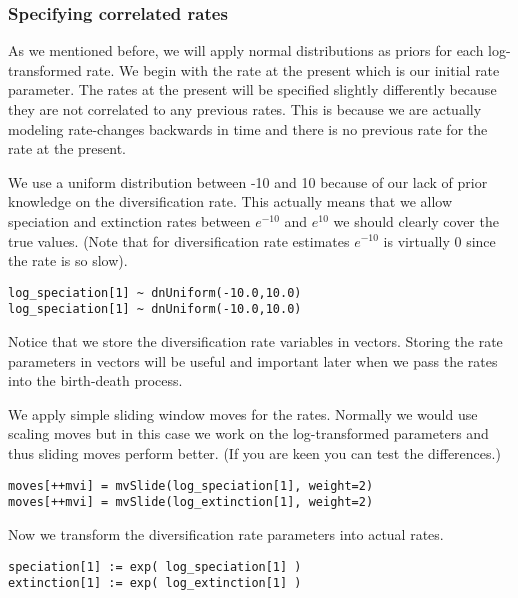 \subsubsection{Specifying correlated rates}
As we mentioned before, we will apply normal distributions as priors for each log-transformed rate.
We begin with the rate at the present which is our initial rate parameter.
The rates at the present will be specified slightly differently because they are not correlated to any previous rates.
This is because we are actually modeling rate-changes backwards in time and there is no previous rate for the rate at the present.

We use a uniform distribution between -10 and 10 because of our lack of prior knowledge on the diversification rate.
This actually means that we allow speciation and extinction rates between $e^{-10}$ and $e^10$ we should clearly cover the true values.
(Note that for diversification rate estimates $e^{-10}$ is virtually 0 since the rate is so slow).
{\tt \begin{snugshade*}
\begin{lstlisting}
log_speciation[1] ~ dnUniform(-10.0,10.0)
log_speciation[1] ~ dnUniform(-10.0,10.0)
\end{lstlisting}
\end{snugshade*}}
Notice that we store the diversification rate variables in vectors.
Storing the rate parameters in vectors will be useful and important later when we pass the rates into the birth-death process.

We apply simple sliding window moves for the rates.
Normally we would use scaling moves but in this case we work on the log-transformed parameters and thus sliding moves perform better.
(If you are keen you can test the differences.)
{\tt \begin{snugshade*}
\begin{lstlisting}
moves[++mvi] = mvSlide(log_speciation[1], weight=2)
moves[++mvi] = mvSlide(log_extinction[1], weight=2)
\end{lstlisting}
\end{snugshade*}}
Now we transform the diversification rate parameters into actual rates.
{\tt \begin{snugshade*}
\begin{lstlisting}
speciation[1] := exp( log_speciation[1] )
extinction[1] := exp( log_extinction[1] )
\end{lstlisting}
\end{snugshade*}}

